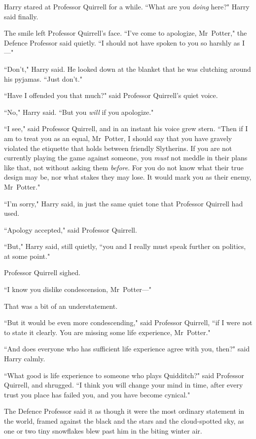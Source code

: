 Harry stared at Professor Quirrell for a while. ``What are you \emph{doing} here?" Harry said finally.

The smile left Professor Quirrell's face. ``I've come to apologize, Mr~Potter," the Defence Professor said quietly. ``I should not have spoken to you so harshly as I—"

``Don't," Harry said. He looked down at the blanket that he was clutching around his pyjamas. ``Just don't."

``Have I offended you that much?" said Professor Quirrell's quiet voice.

``No," Harry said. ``But you \emph{will} if you apologize."

``I see," said Professor Quirrell, and in an instant his voice grew stern. ``Then if I am to treat you as an equal, Mr~Potter, I should say that you have gravely violated the etiquette that holds between friendly Slytherins. If you are not currently playing the game against someone, you \emph{must} not meddle in their plans like that, not without asking them \emph{before}. For you do not know what their true design may be, nor what stakes they may lose. It would mark you as their enemy, Mr~Potter."

``I'm sorry," Harry said, in just the same quiet tone that Professor Quirrell had used.

``Apology accepted," said Professor Quirrell.

``But," Harry said, still quietly, ``you and I really must speak further on politics, at some point."

Professor Quirrell sighed.

``I know you dislike condescension, Mr~Potter—"

That was a bit of an understatement.

``But it would be even more condescending," said Professor Quirrell, ``if I were not to state it clearly. You are missing some life experience, Mr~Potter."

``And does everyone who has sufficient life experience agree with you, then?" said Harry calmly.

``What good is life experience to someone who plays Quidditch?" said Professor Quirrell, and shrugged. ``I think you will change your mind in time, after every trust you place has failed you, and you have become cynical."

The Defence Professor said it as though it were the most ordinary statement in the world, framed against the black and the stars and the cloud-spotted sky, as one or two tiny snowflakes blew past him in the biting winter air.

